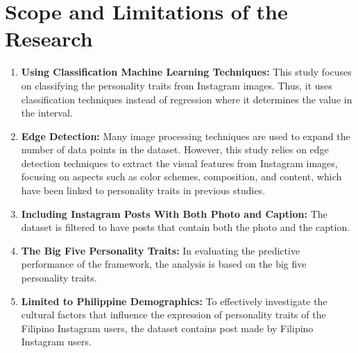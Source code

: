 
\section{Scope and Limitations of the Research}
\label{sec:scopelimitations}

\begin{enumerate}[label=\textbf{ \arabic*:}, leftmargin=*]
	\item \textbf{Using Classification Machine Learning Techniques:} This study focuses on classifying the personality traits from Instagram images. Thus, it uses classification techniques instead of regression where it determines the value in the interval.
	 
	\item \textbf{Edge Detection:} Many image processing techniques are used to expand the number of data points in the dataset. However, this study relies on edge detection techniques to extract the visual features from Instagram images, focusing on aspects such as color schemes, composition, and content, which have been linked to personality traits in previous studies.
	
	\item \textbf{Including Instagram Posts With Both Photo and Caption:} The dataset is filtered to have posts that contain both the photo and the caption.
	
	\item \textbf{The Big Five Personality Traits:} In evaluating the predictive performance of the framework, the analysis is based on the big five personality traits.
	
	\item \textbf{Limited to Philippine Demographics:} To effectively investigate the cultural factors that influence the expression of personality traits of the Filipino Instagram users, the dataset contains post made by Filipino Instagram users.
\end{enumerate}



